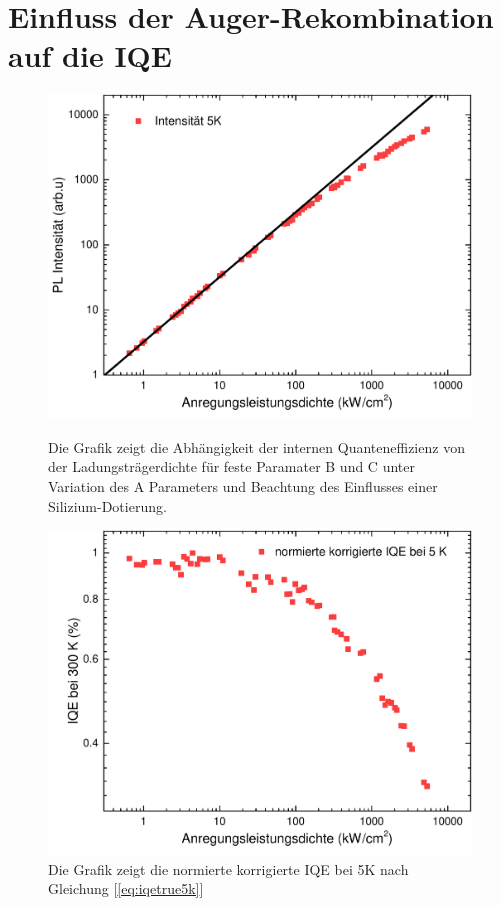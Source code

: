 \newpage

\section{Einfluss der Auger-Rekombination auf die IQE}
%
\begin{figure}[h]
    \centering
    \begin{minipage}[t]{0.49\linewidth}
        \centering
        \includegraphics[width=\linewidth]{Bilder/AugerBei5K.pdf}
        \caption{Die Grafik zeigt die Abhängigkeit der internen Quanteneffizienz von der Ladungsträgerdichte für feste Paramater B und C unter Variation des A Parameters und Beachtung des Einflusses einer Silizium-Dotierung.}
        \label{fig:auger5k}
    \end{minipage}%
    \hfill
    \begin{minipage}[t]{0.49\linewidth}
        \centering
        \includegraphics[width=\linewidth]{Bilder/NormierteKorrgierteIQE5K.pdf}
        \caption{Die Grafik zeigt die normierte korrigierte IQE bei 5K nach Gleichung [\ref{eq:iqetrue5k}] }
        \label{fig:trueiqe}
    \end{minipage}
\end{figure}
